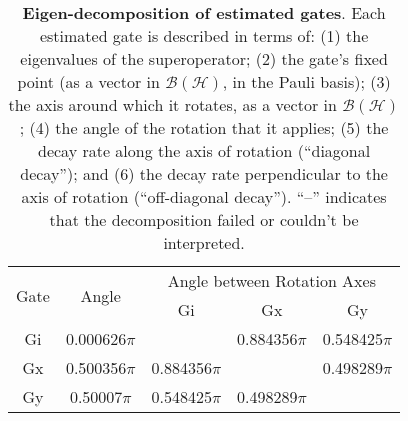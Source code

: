 {\begin{table}[h]
\begin{center}
\vspace{2em}
\begin{tabular}[l]{|c|c|c|c|c|}
\hline
\multirow{2}{*}{Gate} & \multirow{2}{*}{Angle} & \multicolumn{3}{c|}{Angle between Rotation Axes} \\ \cline{3-5}
 & & Gi & Gx & Gy \\ \hline
Gi & 0.000626$\pi$ &  & 0.884356$\pi$ & 0.548425$\pi$ \\ \hline
Gx & 0.500356$\pi$ & 0.884356$\pi$ &  & 0.498289$\pi$ \\ \hline
Gy & 0.50007$\pi$ & 0.548425$\pi$ & 0.498289$\pi$ &  \\ \hline
\end{tabular}

\caption{\textbf{Eigen-decomposition of estimated gates}.  Each estimated gate is described in terms of: (1) the eigenvalues of the superoperator; (2) the gate's fixed point (as a vector in $\mathcal{B}(\mathcal{H})$, in the Pauli basis); (3)  the axis around which it rotates, as a vector in $\mathcal{B}(\mathcal{H})$; (4) the angle of the rotation that it applies; (5) the decay rate along the axis of rotation (``diagonal decay''); and (6) the decay rate perpendicular to the axis of rotation (``off-diagonal decay'').  ``--'' indicates that the decomposition failed or couldn't be interpreted. \label{bestCPTPGatesetDecompTable}}
\end{center}
\end{table}


}
